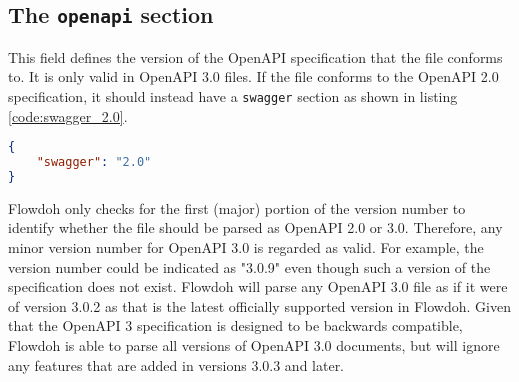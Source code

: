 \subsection{The \texttt{openapi} section}
This field defines the version of the OpenAPI specification that the file conforms to. It is only valid in OpenAPI 3.0 files. If the file conforms to the OpenAPI 2.0 specification, it should instead have a \texttt{swagger} section as shown in listing \ref{code:swagger_2.0}.\\
\begin{minipage}{\textwidth}
\begin{lstlisting}[caption={Alternative to the \texttt{openapi} section in OpenAPI 2.0},label={code:swagger_2.0},language=json]
{
    "swagger": "2.0"
}
\end{lstlisting}
\end{minipage}
Flowdoh only checks for the first (major) portion of the version number to identify whether the file should be parsed as OpenAPI 2.0 or 3.0. Therefore, any minor version number for OpenAPI 3.0 is regarded as valid. For example, the version number could be indicated as "3.0.9" even though such a version of the specification does not exist. Flowdoh will parse any OpenAPI 3.0 file as if it were of version 3.0.2 as that is the latest officially supported version in Flowdoh. Given that the OpenAPI 3 specification is designed to be backwards compatible, Flowdoh is able to parse all versions of OpenAPI 3.0 documents, but will ignore any features that are added in versions 3.0.3 and later.
